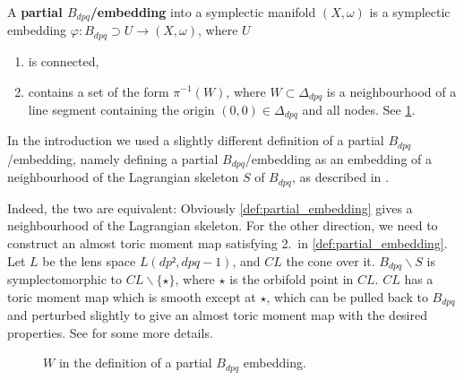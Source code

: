 \documentclass[AIF,Unicode,manuscript]{cedram}
\begin{document}
\begin{definition}
    \label{def:partial_embedding}
    A \textbf{partial $B_{dpq}$\-/embedding} into a symplectic manifold $(X,\omega)$ is a symplectic embedding $φ\colon B_{dpq} ⊃ U → (X,ω)$, where $U$ 
    \begin{enumerate}
        \item is connected, 
        \item contains a set of the form $\pi^{-1}(W)$, where $W \subset \Delta_{dpq}$ is a neighbourhood of a line segment containing the origin $(0,0) \in \Delta_{dpq}$ and all nodes.
 See \cref{fig:partial-Bdpq-embedding}.   
    \end{enumerate}
\end{definition}

\begin{remark}
  In the introduction we used a slightly different definition of a partial $B_{dpq}$\-/embedding, namely defining a partial $B_{dpq}$\-/embedding as an embedding of a neighbourhood of the Lagrangian skeleton $S$ of $B_{dpq}$, as described in \cite[Remark 7.10]{evans2021atfs}.

  Indeed, the two are equivalent:
  Obviously \cref{def:partial_embedding} gives a neighbourhood of the Lagrangian skeleton.
  For the other direction, we need to construct an almost toric moment map satisfying 2.\ in \cref{def:partial_embedding}.
  Let $L$ be the lens space $L(dp²,dpq-1)$, and $CL$ the cone over it.
  $B_{dpq} ∖ S$ is symplectomorphic to $C L ∖ \{ ⋆\}$, where $⋆$ is the orbifold point in $CL$.
  $CL$ has a toric moment map which is smooth except at $⋆$, which can be pulled back to $B_{dpq}$ and perturbed slightly to give an almost toric moment map with the desired properties.
  See \cite{Eva19} for some more details.
\end{remark}

\begin{figure}
    \centering
    \caption{$W$ in the definition of a partial $B_{dpq}$ embedding.}
    \label{fig:partial-Bdpq-embedding}
\end{figure}
\end{document}
